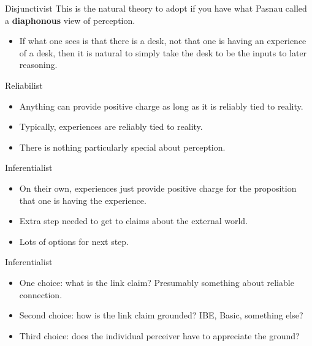 \documentclass[
  17pt,
  letterpaper,
  ignorenonframetext,
  aspectratio=169,
  xcolor={dvipsnames}]{beamer}
\providecommand{\tightlist}{%
  \setlength{\itemsep}{0pt}\setlength{\parskip}{0pt}}\usepackage{longtable,booktabs,array}
\begin{document}
\begin{frame}{Disjunctivist}
\protect\hypertarget{disjunctivist-1}{}
This is the natural theory to adopt if you have what Pasnau called a
\textbf{diaphonous} view of perception.

\begin{itemize}[<+->]
\tightlist
\item
  If what one sees is that there is a desk, not that one is having an
  experience of a desk, then it is natural to simply take the desk to be
  the inputs to later reasoning.
\end{itemize}
\end{frame}

\begin{frame}{Reliabilist}
\protect\hypertarget{reliabilist}{}
\begin{itemize}[<+->]
\tightlist
\item
  Anything can provide positive charge as long as it is reliably tied to
  reality.
\item
  Typically, experiences are reliably tied to reality.
\item
  There is nothing particularly special about perception.
\end{itemize}
\end{frame}

\begin{frame}{Inferentialist}
\protect\hypertarget{inferentialist}{}
\begin{itemize}[<+->]
\tightlist
\item
  On their own, experiences just provide positive charge for the
  proposition that one is having the experience.
\item
  Extra step needed to get to claims about the external world.
\item
  Lots of options for next step.
\end{itemize}
\end{frame}

\begin{frame}{Inferentialist}
\protect\hypertarget{inferentialist-1}{}
\begin{itemize}[<+->]
\tightlist
\item
  One choice: what is the link claim? Presumably something about
  reliable connection.
\item
  Second choice: how is the link claim grounded? IBE, Basic, something
  else?
\item
  Third choice: does the individual perceiver have to appreciate the
  ground?
\end{itemize}
\end{frame}
\end{document}
